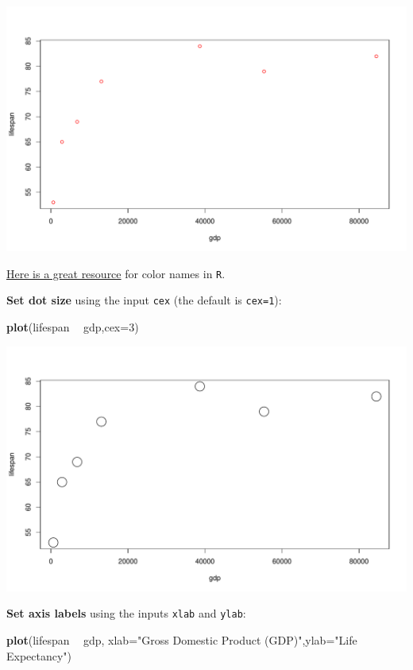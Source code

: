 \documentclass[
]{book}
\newenvironment{Shaded}{\begin{snugshade}}{\end{snugshade}}
\newcommand{\DataTypeTok}[1]{\textcolor[rgb]{0.13,0.29,0.53}{#1}}
\newcommand{\DecValTok}[1]{\textcolor[rgb]{0.00,0.00,0.81}{#1}}
\newcommand{\KeywordTok}[1]{\textcolor[rgb]{0.13,0.29,0.53}{\textbf{#1}}}
\newcommand{\NormalTok}[1]{#1}
\newcommand{\OperatorTok}[1]{\textcolor[rgb]{0.81,0.36,0.00}{\textbf{#1}}}
\newcommand{\StringTok}[1]{\textcolor[rgb]{0.31,0.60,0.02}{#1}}
\begin{document}
\includegraphics{figures/unnamed-chunk-107-1.pdf}

\href{http://www.stat.columbia.edu/~tzheng/files/Rcolor.pdf?utm_source=twitterfeed\&utm_medium=twitter}{Here is a great resource} for color names in \texttt{R}.

\textbf{Set dot size} using the input \texttt{cex} (the default is \texttt{cex=1}):

\begin{Shaded}
\begin{Highlighting}[]
\KeywordTok{plot}\NormalTok{(lifespan }\OperatorTok{~}\StringTok{ }\NormalTok{gdp,}\DataTypeTok{cex=}\DecValTok{3}\NormalTok{)}
\end{Highlighting}
\end{Shaded}

\includegraphics{figures/unnamed-chunk-108-1.pdf}

\textbf{Set axis labels} using the inputs \texttt{xlab} and \texttt{ylab}:

\begin{Shaded}
\begin{Highlighting}[]
\KeywordTok{plot}\NormalTok{(lifespan }\OperatorTok{~}\StringTok{ }\NormalTok{gdp, }\DataTypeTok{xlab=}\StringTok{"Gross Domestic Product (GDP)"}\NormalTok{,}\DataTypeTok{ylab=}\StringTok{"Life Expectancy"}\NormalTok{)}
\end{Highlighting}
\end{Shaded}
\end{document}
